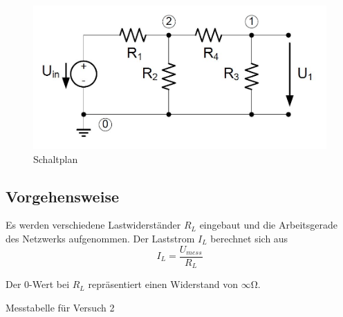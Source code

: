 \documentclass[10pt]{report}
\begin{document}
        \begin{center}
            \begin{figure}[H]
                \includegraphics[width=\textwidth]{EinfachesNetzwerk.JPG}
              \caption{Schaltplan}
            \end{figure}
        \end{center}


        \subsection{Vorgehensweise}
        Es werden verschiedene Lastwiderständer $R_L$ eingebaut und die Arbeitsgerade
        des Netzwerks aufgenommen. Der Laststrom $I_L$ berechnet sich aus
        \begin{equation*}
            I_L = \frac{U_{mess}}{R_L}
        \end{equation*}


        \vspace{0.5cm}

        Der $0$-Wert bei $R_L$ repräsentiert einen Widerstand von $\infty \si{\ohm}$.
        \begin{table}[H]
            \begin{center}
                \caption{Messtabelle für Versuch 2}
                \label{tableb}
            \end{center}
        \end{table}
\end{document}
